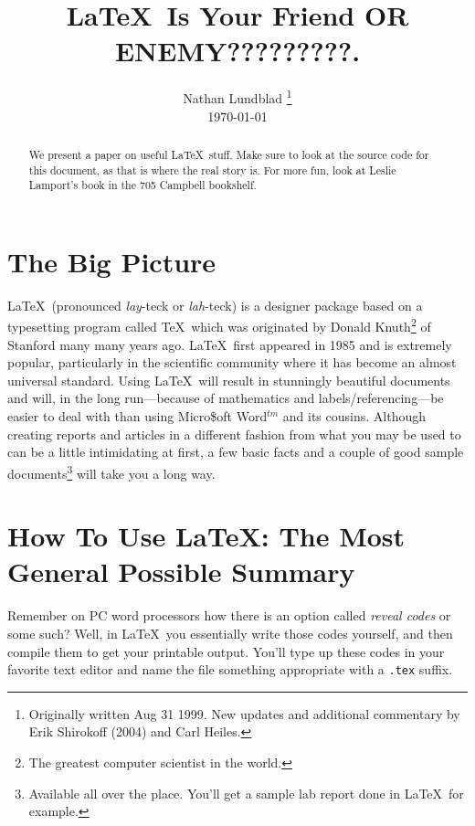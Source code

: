 \documentclass[preprint]{aastex}
\begin{document}
\title{\LaTeX\ Is Your Friend OR ENEMY?????????.}

\author{Nathan Lundblad \footnote{Originally written Aug 31 1999. New 
\LaTeXe updates and additional commentary by Erik
Shirokoff (2004) and Carl Heiles.} \\ \today}

\begin{abstract} We present a paper on useful \LaTeX\ stuff.  Make sure
to look at the source code for this document, as that is where the real
story is.  For more fun, look at Leslie Lamport's book in the 705
Campbell bookshelf.  \end{abstract}

\tableofcontents

\section{The Big Picture}\label{bigpicsec} %

        \LaTeX\ (pronounced {\it lay}-teck or {\it lah}-teck) is a
designer package based on a typesetting program called \TeX\, which was
originated by Donald Knuth\footnote{The greatest computer scientist in
the world.} of Stanford many many years ago.  \LaTeX\ first appeared in
1985 and is extremely popular, particularly in the scientific community
where it has become an almost universal standard.  Using \LaTeX\ will
result in stunningly beautiful documents and will, in the long
run---because of mathematics and labels/referencing---be easier to deal
with than using Micro\$oft Word$^{tm}$ and its cousins.  Although
creating reports and articles in a different fashion from what you may
be used to can be a little intimidating at first, a few basic facts and
a couple of good sample documents\footnote{Available all over the place.
You'll get a sample lab report done in \LaTeX\, for example.  } will
take you a long way.

\section{How To Use \LaTeX: The Most General Possible Summary}
\label{howtosec}

        Remember on PC word processors how there is an option called
{\it reveal codes} or some such? Well, in \LaTeX\ you essentially write
those codes yourself, and then compile them to get your printable
output.  You'll type up these codes in your favorite text editor and
name the file something appropriate with a \verb&.tex& suffix.
\end{document}
